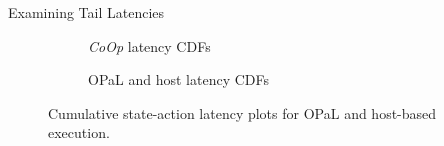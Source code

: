 \documentclass[aspectratio=169,xcolor={dvipsnames}
,handout
]{beamer}
\newcommand{\approachshort}{OPaL}
\newcommand{\Coopfw}{\emph{CoOp}}
\begin{document}
\begin{frame}{Examining Tail Latencies}
	\begin{figure}
		\centering
		\begin{subfigure}{0.45\linewidth}
			\caption{\Coopfw{} latency CDFs}
		\end{subfigure}
		\begin{subfigure}{0.45\linewidth}
			\caption{\approachshort{} and host latency CDFs}
		\end{subfigure}
		\caption{Cumulative state-action latency plots for \approachshort{} and host-based execution.\label{fig:lat-cumul}}
	\end{figure}
\end{frame}
\end{document}
